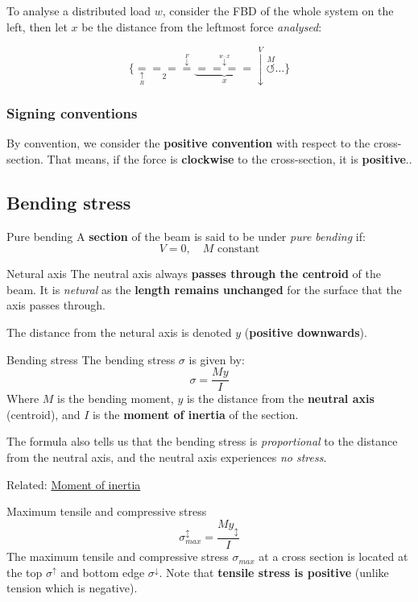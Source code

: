 \documentclass{article}
\begin{document}
\vspace{1cm}
To analyse a distributed load $w$, consider the FBD of the whole system on the left, then let $x$ be the distance from the leftmost force \emph{analysed}:

\large
\[\{\underset{\underset{R}{\uparrow}}{=}\underset{2}{==}\overset{\overset{F}{\downarrow}}{=}\underbrace{\overset{\overset{w\cdot x}{\downarrow}}{====}}_x\overset{V}{\downarrow}\overset{M}{\circlearrowleft}\dots\}\]

\subsubsection{Signing conventions}
By convention, we consider the \textbf{positive convention} with respect to the cross-section. That means, if the force is \textbf{clockwise} to the cross-section, it is \textbf{positive}..

\label{sec:bendingstress}
\subsection{Bending stress}
\begin{definition}
    {Pure bending}
    A \textbf{section} of the beam is said to be under \emph{pure bending} if:
    \[V=0,\quad M\text{ constant}\]
\end{definition}
\begin{knBox}
    {Netural axis}
    The neutral axis always \textbf{passes through the centroid} of the beam. It is \emph{netural} as the \textbf{length remains unchanged} for the surface that the axis passes through.

    The distance from the netural axis is denoted $y$ (\textbf{positive downwards}).
\end{knBox}
\begin{theorem}
    {Bending stress}
    The bending stress $\sigma$ is given by:
    \[\sigma=\frac{My}{I}\]
    Where $M$ is the bending moment, $y$ is the distance from the \textbf{neutral axis} (centroid), and $I$ is the \textbf{moment of inertia} of the section.

    The formula also tells us that the bending stress is \emph{proportional} to the distance from the neutral axis, and the neutral axis experiences \emph{no stress}.

    Related: \hyperref[sec:momentinertia]{Moment of inertia}
\end{theorem}
\begin{theorem}
    {Maximum tensile and compressive stress}
    \[\sigma^\updownarrow_{max}=\frac{My_\updownarrow}{I}\]
    The maximum tensile and compressive stress $\sigma_{max}$ at a cross section is located at the top $\sigma^\uparrow$  and bottom edge $\sigma^\downarrow$. Note that \textbf{tensile stress is positive} (unlike tension which is negative).
\end{theorem}
\end{document}

